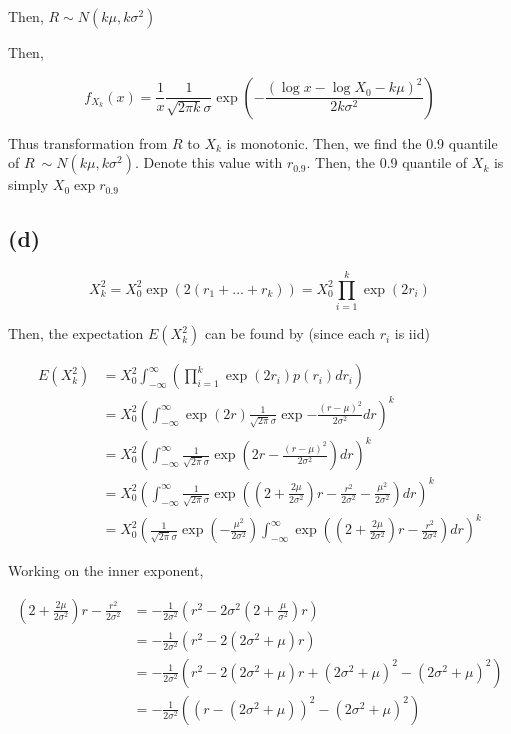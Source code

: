 \documentclass[11pt]{scrartcl}
\begin{document}
Then, $R \sim N(k\mu, k\sigma^2)$

Then,

\[f_{X_k}(x) = \frac{1}{x}\frac{1}{\sqrt{2\pi k}\sigma} \exp{\left(- \frac{(\log{x} - \log{X_0} - k\mu)^2}{2k\sigma^2}\right)}\]

Thus transformation from $R$ to $X_k$ is monotonic. Then, we find the 0.9 quantile of $R ~ \sim N(k\mu, k\sigma^2)$. Denote this value with $r_{0.9}$. Then, the 0.9 quantile of $X_k$ is simply $X_0 \exp{r_{0.9}}$

\subsection*{(d)}

\[X_k^2 = X_0^2 \exp{\left(2 (r_1 + ... + r_k) \right)} = X_0^2 \prod_{i=1}^k \exp{(2r_i)} \]

Then, the expectation $E(X_k^2)$ can be found by (since each $r_i$ is iid)

\begin{align*}
E(X_k^2) &= X_0^2 \int_{-\infty}^\infty \left( \prod_{i=1}^k \exp{(2r_i)} p(r_i) dr_i \right) \\
&= X_0^2 \left( \int_{-\infty}^{\infty} \exp{(2r)} \frac{1}{\sqrt{2\pi}\sigma} \exp{-\frac{(r-\mu)^2}{2\sigma^2}} dr \right)^k \\
&= X_0^2 \left( \int_{-\infty}^{\infty} \frac{1}{\sqrt{2\pi}\sigma} \exp{\left(2r-\frac{(r-\mu)^2}{2\sigma^2}\right)} dr \right)^k \\
&= X_0^2 \left( \int_{-\infty}^{\infty} \frac{1}{\sqrt{2\pi}\sigma} \exp{\left(\left(2 + \frac{2\mu}{2\sigma^2}\right)r - \frac{r^2}{2\sigma^2} - \frac{\mu^2}{2\sigma^2}\right)} dr \right)^k \\
&= X_0^2 \left(\frac{1}{\sqrt{2\pi}\sigma} \exp{\left(-\frac{\mu^2}{2\sigma^2}\right)} \int_{-\infty}^{\infty} \exp{\left(\left(2 + \frac{2\mu}{2\sigma^2}\right)r - \frac{r^2}{2\sigma^2}\right)} dr \right)^k
\end{align*}

Working on the inner exponent,

\begin{align*}
\left(2 + \frac{2\mu}{2\sigma^2}\right)r - \frac{r^2}{2\sigma^2} &= -\frac{1}{2\sigma^2} \left(r^2 - 2\sigma^2 \left(2 + \frac{\mu}{\sigma^2}\right)r \right) \\
&= -\frac{1}{2\sigma^2} \left( r^2 - 2 (2\sigma^2 + \mu) r\right) \\
&= -\frac{1}{2\sigma^2} \left( r^2 - 2 (2\sigma^2+\mu)r + (2\sigma^2+\mu)^2 - (2\sigma^2 + \mu)^2\right) \\
&= -\frac{1}{2\sigma^2} \left(\left(r - (2\sigma^2 + \mu)\right)^2 - (2\sigma^2 + \mu)^2\right)
\end{align*}
\end{document}
